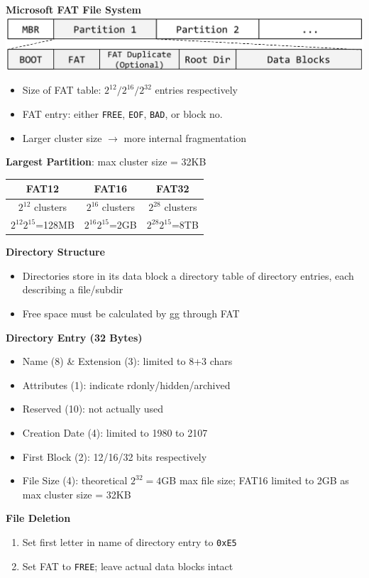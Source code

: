 \documentclass[a4paper, 12pt]{article}
\begin{document}
\begin{multicols*}{4}
{\small\textbf{Microsoft FAT File System}}\\
\includegraphics[scale=0.185]{fat-layout.png}
\begin{itemize}
	\item Size of FAT table: $2^{12}/2^{16}/2^{32}$ entries respectively
	\item FAT entry: either \texttt{FREE}, \texttt{EOF}, \texttt{BAD}, or block no.
	\item Larger cluster size $\rightarrow$ more internal fragmentation
\end{itemize}
\textbf{Largest Partition}: max cluster size = 32KB\\ 
\begin{tabular}{ |c|c|c| }
    \hline
	\textbf{FAT12} & \textbf{FAT16} & \textbf{FAT32} \\
	\hline
	$2^{12}$ clusters & $2^{16}$ clusters & $2^{28}$ clusters \\
	$2^{12}2^{15}$=128MB & $2^{16}2^{15}$=2GB & $2^{28}2^{15}$=8TB \\
	\hline
\end{tabular}
\textbf{Directory Structure}
\begin{itemize}
	\item Directories store in its data block a directory table of directory entries, each describing a file/subdir
	\item Free space must be calculated by gg through FAT
\end{itemize}
\textbf{Directory Entry (32 Bytes)}
\begin{itemize}
	\item Name (8) \& Extension (3): limited to 8+3 chars
	\item Attributes (1): indicate rdonly/hidden/archived
	\item Reserved (10): not actually used
	\item Creation Date (4): limited to 1980 to 2107
	\item First Block (2): 12/16/32 bits respectively
	\item File Size (4): theoretical $2^{32}=4$GB max file size; FAT16 limited to 2GB as max cluster size = 32KB
\end{itemize}
\textbf{File Deletion}
\begin{enumerate}
	\item Set first letter in name of directory entry to \texttt{0xE5}
	\item Set FAT to \texttt{FREE}; leave actual data blocks intact
\end{enumerate}


\end{multicols*}
\end{document}
